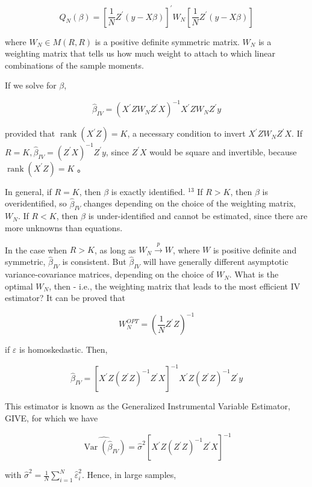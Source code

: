 $$
Q_{N}(\beta)=\left[\frac{1}{N} Z^{\prime}(y-X \beta)\right]^{\prime} W_{N}\left[\frac{1}{N} Z^{\prime}(y-X \beta)\right]
$$

where $W_{N} \in M(R, R)$ is a positive definite symmetric matrix. $W_{N}$ is a weighting matrix that tells us how much weight to attach to which linear combinations of the sample moments.

If we solve for $\beta$,

$$
\widehat{\beta}_{I V}=\left(X^{\prime} Z W_{N} Z^{\prime} X\right)^{-1} X^{\prime} Z W_{N} Z^{\prime} y
$$

provided that $\operatorname{rank}\left(X^{\prime} Z\right)=K$, a necessary condition to invert $X^{\prime} Z W_{N} Z^{\prime} X$. If $R=K, \widehat{\beta}_{I V}=\left(Z^{\prime} X\right)^{-1} Z^{\prime} y$, since $Z^{\prime} X$ would be square and invertible, because $\operatorname{rank}\left(X^{\prime} Z\right)=K$ 。

In general, if $R=K$, then $\beta$ is exactly identified. ${ }^{13}$ If $R>K$, then $\beta$ is overidentified, so $\widehat{\beta}_{I V}$ changes depending on the choice of the weighting matrix, $W_{N}$. If $R<K$, then $\beta$ is under-identified and cannot be estimated, since there are more unknowns than equations.

In the case when $R>K$, as long as $W_{N} \xrightarrow{p} W$, where $W$ is positive definite and symmetric, $\widehat{\beta}_{I V}$ is consistent. But $\widehat{\beta}_{I V}$ will have generally different asymptotic variance-covariance matrices, depending on the choice of $W_{N}$. What is the optimal $W_{N}$, then - i.e., the weighting matrix that leads to the most efficient IV estimator? It can be proved that

$$
W_{N}^{O P T}=\left(\frac{1}{N} Z^{\prime} Z\right)^{-1}
$$

if $\varepsilon$ is homoskedastic. Then,

$$
\widehat{\beta}_{I V}=\left[X^{\prime} Z\left(Z^{\prime} Z\right)^{-1} Z^{\prime} X\right]^{-1} X^{\prime} Z\left(Z^{\prime} Z\right)^{-1} Z^{\prime} y
$$

This estimator is known as the Generalized Instrumental Variable Estimator, GIVE, for which we have

$$
\widehat{\operatorname{Var}\left(\widehat{\beta}_{I V}\right)}=\widehat{\sigma}^{2}\left[X^{\prime} Z\left(Z^{\prime} Z\right)^{-1} Z^{\prime} X\right]^{-1}
$$

with $\widehat{\sigma}^{2}=\frac{1}{N} \sum_{i=1}^{N} \widehat{\varepsilon}_{i}^{2}$. Hence, in large samples,


